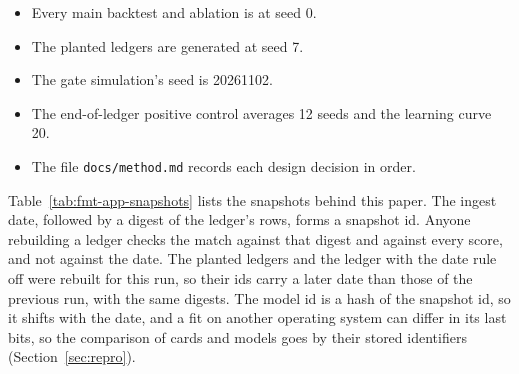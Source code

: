 \begin{itemize}
\item Every main backtest and ablation is at seed 0.
\item The planted ledgers are generated at seed 7.
\item The gate simulation's seed is 20261102.
\item The end-of-ledger positive control averages 12 seeds and the learning curve 20.
\item The file \texttt{docs/method.md} records each design decision in order.
\end{itemize}
Table~\ref{tab:fmt-app-snapshots} lists the snapshots behind this paper.
The ingest date, followed by a digest of the ledger's rows, forms a snapshot id. Anyone rebuilding a ledger checks the match against that digest and against every score, and not against the date. The planted ledgers and the ledger with the date rule off were rebuilt for this run, so their ids carry a later date than those of the previous run, with the same digests.
The model id is a hash of the snapshot id, so it shifts with the date, and a fit on another operating system can differ in its last bits, so the comparison of cards and models goes by their stored identifiers (Section~\ref{sec:repro}).

\begin{table}[tp]\centering\scriptsize
\caption{Snapshots that this paper rests on. The rows give the ledgers. The columns give the date and digest of the snapshot, and then the model id and the feature hash.}
\label{tab:fmt-app-snapshots}
\resizebox{\columnwidth}{!}{}
\end{table}

